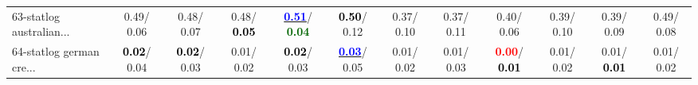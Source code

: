 \begin{table}[h]
\begin{center}
{\begin{tabular}{lc|c|c|c|c|c|c|c|c|c|c}
63-statlog australian... &   0.49/  0.06 &   0.48/  0.07 &   0.48/\textcolor{black}{\textbf{  0.05}} & \underline{\textcolor{blue}{\textbf{  0.51}}}/\textcolor{darkgreen}{\textbf{  0.04}} & \textcolor{black}{\textbf{  0.50}}/  0.12 &   0.37/  0.10 &   0.37/  0.11 &   0.40/  0.06 &   0.39/  0.10 &   0.39/  0.09 &   0.49/  0.08 \\
64-statlog german cre... & \textcolor{black}{\textbf{  0.02}}/  0.04 & \textcolor{black}{\textbf{  0.02}}/  0.03 &   0.01/  0.02 & \textcolor{black}{\textbf{  0.02}}/  0.03 & \underline{\textcolor{blue}{\textbf{  0.03}}}/  0.05 &   0.01/  0.02 &   0.01/  0.03 & \textcolor{red}{\textbf{  0.00}}/\textcolor{black}{\textbf{  0.01}} &   0.01/  0.02 &   0.01/\textcolor{black}{\textbf{  0.01}} &   0.01/  0.02 \\\end{tabular}}\label{stratsALCKappa1aVFDTRedux}
\end{center}
\end{table}
